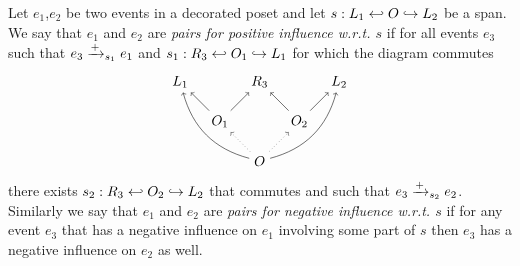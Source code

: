 \begin{definition}
  Let $e_1$,$e_2$ be two events in a decorated poset and let $s:L_1\hookleftarrow O\hookrightarrow L_2$ be a span. We say that $e_1$ and $e_2$ are \emph{pairs for positive influence w.r.t. $s$} if for all events $e_3$ such that $e_3\mathrel{\xrightarrow{+}}_{s_1} e_1$ and $s_1:R_3\hookleftarrow O_1\hookrightarrow L_1$ for which the diagram commutes
  \[
  \begin{tikzpicture} %
      \node (o) at (0,-1) {\(O\)};
      \node (r3) at (0,1) {\(R_3\)};
      \node (o1) at (-1,0) {\(O_1\)};
      \node (o2) at (1,0) {\(O_2\)};
      \node (r1) at (-2,1) {\(L_1\)};
      \node (r2) at (2,1) {\(L_2\)};
      \draw [dotted,->] (o) -- (o1);
      \draw [dotted,->] (o) -- (o2);
      \draw [->] (o1) -- (r3);
      \draw [->] (o2) -- (r3);
      \draw [->] (o1) -- (r1);
      \draw [->] (o2) -- (r2);
      \draw [->] (o) to [bend left] (r1);
      \draw [->] (o) to [bend right] (r2);
    \end{tikzpicture}
    \]
there exists $s_2:R_3\hookleftarrow O_2\hookrightarrow L_2$ that commutes and such that $e_3\mathrel{\xrightarrow{+}}_{s_2} e_2$.
Similarly we say that $e_1$ and $e_2$ are \emph{pairs for negative influence w.r.t. $s$} if for any event $e_3$ that has a negative influence on $e_1$ involving some part of $s$ then $e_3$ has a negative influence on $e_2$ as well.
\end{definition}

